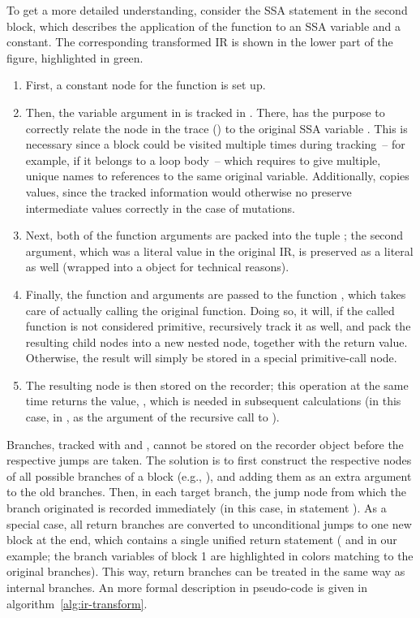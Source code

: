 To get a more detailed understanding, consider the SSA statement  in the second
block, which describes the application of the function \jlinl{+} to an SSA variable and a constant.
The corresponding transformed IR is shown in the lower part of the figure, highlighted in green.
\begin{enumerate}
  \firmlist
\item First, a constant node  for the function is set up.
\item Then, the variable argument in is tracked in .  There,  has
  the purpose to correctly relate the node in the trace () to the original SSA variable
  .  This is necessary since a block could be visited multiple times during tracking~--
  for example, if it belongs to a loop body~-- which requires to give multiple, unique names to
  references to the same original variable.  Additionally,  copies values,
  since the tracked information would otherwise no preserve intermediate values correctly in the
  case of mutations.
\item Next, both of the function arguments are packed into the tuple ; the second
  argument, which was a literal value  in the original IR, is preserved as a literal as
  well (wrapped into a  object for technical reasons).
\item Finally, the function and arguments are passed to the function , which
  takes care of actually calling the original function.  Doing so, it will, if the called function is
  not considered primitive, recursively track it as well, and pack the resulting child nodes into a
  new nested node, together with the return value.  Otherwise, the result will simply be stored in a
  special primitive-call node.
\item The resulting node is then stored on the recorder; this operation at the same time returns the
  value, , which is needed in subsequent calculations (in this case, in , as
  the argument of the recursive call to ).
\end{enumerate}
Branches, tracked with  and , cannot be stored on the
recorder object before the respective jumps are taken.  The solution is to first construct the
respective nodes of all possible branches of a block (e.g., ), and adding them as an
extra argument to the old branches.  Then, in each target branch, the jump node from which the
branch originated is recorded immediately (in this case, in statement ).  As a special
case, all return branches are converted to unconditional jumps to one new block at the end, which
contains a single unified return statement ( and  in our example; the branch
variables of block 1 are highlighted in colors matching to the original branches).  This way, return
branches can be treated in the same way as internal branches.  An more formal description in
pseudo-code is given in algorithm~\ref{alg:ir-transform}.

